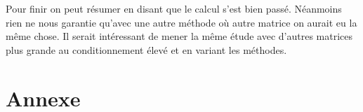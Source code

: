 \documentclass[12,french]{report}
\begin{document}
Pour finir on peut résumer en disant que le calcul s'est bien passé. Néanmoins rien ne nous garantie qu'avec une autre méthode où autre matrice on aurait eu la même chose. Il serait intéressant de mener la même étude avec d'autres matrices plus grande au conditionnement élevé et en variant les méthodes.

\chapter*{Annexe}
\end{document}
